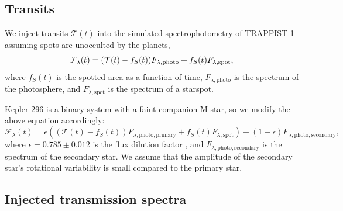 
\subsection{Transits}

We inject \citet{Mandel2002} transits $\mathcal{T}(t)$ into the simulated spectrophotometry of TRAPPIST-1 assuming spots are unocculted by the planets,
\begin{equation}
\mathcal{F}_{\lambda}(t) = (\mathcal{T}(t) - f_S(t))F_{\lambda, \mathrm{photo}} +\\
f_S(t) F_{\lambda, \mathrm{spot}},
\end{equation}
where $f_S(t)$ is the spotted area as a function of time, $F_{\lambda, \mathrm{photo}}$ is the spectrum of the photosphere, and $F_{\lambda, \mathrm{spot}}$ is the spectrum of a starspot. 


Kepler-296 is a binary system with a faint companion M star, so we modify the above equation accordingly:
\begin{equation}
\mathcal{F}_{\lambda}(t) = \epsilon ( (\mathcal{T}(t) - f_S(t))F_{\lambda, \mathrm{photo, primary}} + f_S(t) F_{\lambda, \mathrm{spot}} ) + (1 - \epsilon) F_{\lambda, \mathrm{photo, secondary}},
\end{equation}
where $\epsilon = 0.785 \pm 0.012$ is the flux dilution factor \citep{Barclay2015}, and $F_{\lambda, \mathrm{photo, secondary}}$ is the spectrum of the secondary star. We assume that the amplitude of the secondary star's rotational variability is small compared to the primary star.

\subsection{Injected transmission spectra}



